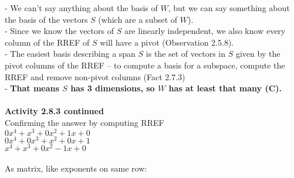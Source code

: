\documentclass{article}
\begin{document}
{- We can't say anything about the basis of $W$, but we can say something about the basis of the vectors $S$ (which are a subset of $W$).\\
- Since we know the vectors of $S$ are linearly independent, we also know every column of the RREF of $S$ will have a pivot (Observation 2.5.8).\\
- The easiest basis describing a span $S$ is the set of vectors in $S$ given by the pivot columns of the RREF -- to compute a basis for a subspace, compute the RREF and remove non-pivot columns (Fact 2.7.3) \\ 
- \textbf{That means $S$ has 3 dimensions, so $W$ has at least that many (C).}\\
\\
\newpage
\noindent \textbf{Activity 2.8.3 continued} \\
Confirming the answer by computing RREF\\
$0x^{4} + x^{3} + 0x^{2} + 1x + 0$\\
$0x^{4} + 0x^{3} + x^{2} + 0x + 1$\\
$x^{4} + x^{3} + 0x^{2} - 1x + 0$\\
\\
As matrix, like exponents on same row:\\

}
\end{document}
